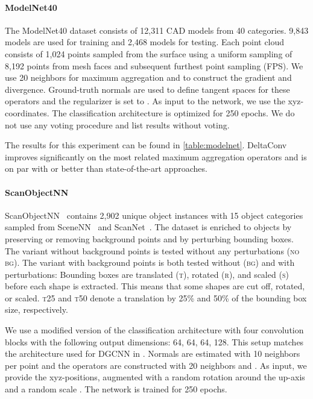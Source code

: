 \documentclass[acmtog, authorversion]{acmart}
\begin{document}
\paragraph{ModelNet40}
The ModelNet40 dataset \cite{Wu2015} consists of 12,311 CAD models from 40 categories. 9,843 models are used for training and 2,468 models for testing. Each point cloud consists of 1,024 points sampled from the surface using a uniform sampling of 8,192 points from mesh faces and subsequent furthest point sampling (FPS). We use 20 neighbors for maximum aggregation and to construct the gradient and divergence. Ground-truth normals are used to define tangent spaces for these operators and the regularizer is set to . As input to the network, we use the xyz-coordinates. The classification architecture is optimized for 250 epochs. We do not use any voting procedure and list results without voting.

The results for this experiment can be found in \autoref{table:modelnet}. DeltaConv improves significantly on the most related maximum aggregation operators and is on par with or better than state-of-the-art approaches.

\paragraph{ScanObjectNN}
ScanObjectNN~\cite{uy-scanobjectnn-iccv19} contains 2,902 unique object instances with 15 object categories sampled from SceneNN~\cite{scenenn-3dv16} and ScanNet~\cite{dai2017scannet}. The dataset is enriched to  objects by preserving or removing background points and by perturbing bounding boxes. The variant without background points is tested without any perturbations (\textsc{no bg}). The variant with background points is both tested without (\textsc{bg}) and with perturbations: Bounding boxes are translated (\textsc{t}), rotated (\textsc{r}), and scaled (\textsc{s}) before each shape is extracted. This means that some shapes are cut off, rotated, or scaled. \textsc{t25} and \textsc{t50} denote a translation by 25\% and 50\% of the bounding box size, respectively.

We use a modified version of the classification architecture with four convolution blocks with the following output dimensions: 64, 64, 64, 128. This setup matches the architecture used for DGCNN in \cite{uy-scanobjectnn-iccv19}. Normals are estimated with 10 neighbors per point and the operators are constructed with 20 neighbors and . As input, we provide the xyz-positions, augmented with a random rotation around the up-axis and a random scale . The network is trained for 250 epochs.
\end{document}
